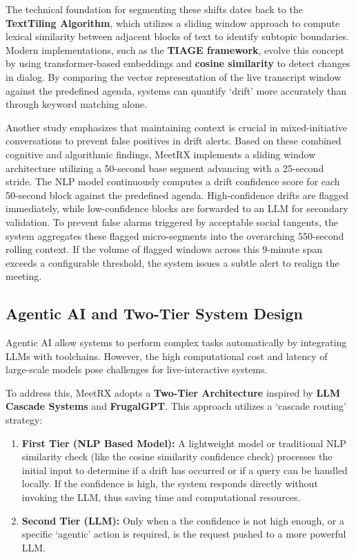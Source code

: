 The technical foundation for segmenting these shifts dates back to the \textbf{TextTiling Algorithm}\cite{hearst1997texttiling}, which utilizes a sliding window approach to compute lexical similarity between adjacent blocks of text to identify subtopic boundaries. Modern implementations, such as the \textbf{TIAGE framework}\cite{tiage}, evolve this concept by using transformer-based embeddings and \textbf{cosine similarity} to detect changes in dialog. By comparing the vector representation of the live transcript window against the predefined agenda, systems can quantify `drift' more accurately than through keyword matching alone.

Another study\cite{topic_shift} emphasizes that maintaining context is crucial in mixed-initiative conversations to prevent false positives in drift alerts. Based on these combined cognitive and algorithmic findings, MeetRX implements a sliding window architecture utilizing a 50-second base segment advancing with a 25-second stride. The NLP model continuously computes a drift confidence score for each 50-second block against the predefined agenda. High-confidence drifts are flagged immediately, while low-confidence blocks are forwarded to an LLM for secondary validation. To prevent false alarms triggered by acceptable social tangents, the system aggregates these flagged micro-segments into the overarching 550-second rolling context. If the volume of flagged windows across this 9-minute span exceeds a configurable threshold, the system issues a subtle alert to realign the meeting.

\subsection{Agentic AI and Two-Tier System Design}
\label{subsection:agentic-ai-cascade}

Agentic AI allow systems to perform complex tasks automatically by integrating LLMs with toolchains\cite{code_analysis_agent}. However, the high computational cost and latency of large-scale models pose challenges for live-interactive systems.

To address this, MeetRX adopts a \textbf{Two-Tier Architecture} inspired by \textbf{LLM Cascade Systems} and \textbf{FrugalGPT}\cite{frugalgpt}. This approach utilizes a `cascade routing' strategy:
\begin{enumerate}
    \item \textbf{First Tier (NLP Based Model):} A lightweight model or traditional NLP similarity check (like the cosine similarity confidence check) processes the initial input to determine if a drift has occurred or if a query can be handled locally. If the confidence is high, the system responds directly without invoking the LLM, thus saving time and computational resources.
    \item \textbf{Second Tier (LLM):} Only when a the confidence is not high enough, or a specific `agentic' action is required, is the request pushed to a more powerful LLM.\@
\end{enumerate}

